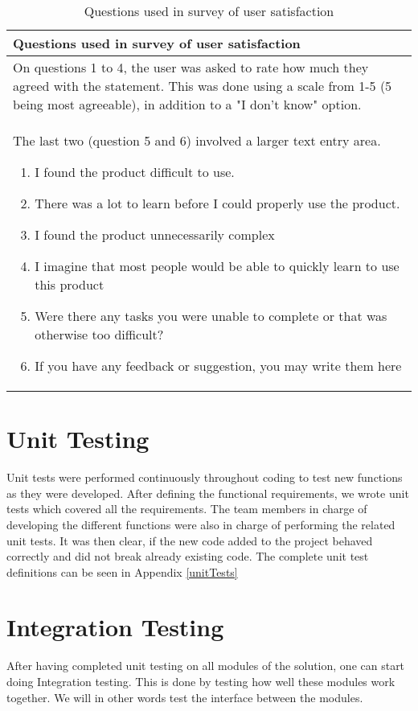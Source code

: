\begin{table}[H]
\centering
\begin{tabu} to 1.0\textwidth{ |X[l]| } 
\hline {}
Questions used in survey of user satisfaction \\
\hline
On questions 1 to 4, the user was asked to rate how much they agreed with the statement. This was done using a scale from 1-5 (5 being most agreeable), in addition to a "I don't know" option.\\
The last two (question 5 and 6) involved a larger text entry area.
\begin{enumerate}
    \item I found the product difficult to use.
    \item There was a lot to learn before I could properly use the product.
    \item I found the product unnecessarily complex
    \item I imagine that most people would be able to quickly learn to use this product
    \item Were there any tasks you were unable to complete or that was otherwise too difficult?
    \item If you have any feedback or suggestion, you may write them here
\end{enumerate}\\
\hline
\end{tabu}
\caption{Questions used in survey of user satisfaction}
\label{table: SUS}
\end{table}

\section{Unit Testing}
Unit tests were performed continuously throughout coding to test new functions as they were developed. After defining the functional requirements, we wrote unit tests which covered all the requirements. 
The team members in charge of developing the different functions were also in charge of performing the related unit tests. It was then clear, if the new code added to the project behaved correctly and did not break already existing code. 
The complete unit test definitions can be seen in Appendix \ref{unitTests}
\section{Integration Testing}
After having completed unit testing on all modules of the solution, one can start doing Integration testing. This is done by testing how well these modules work together. We will in other words test the interface between the modules. 

